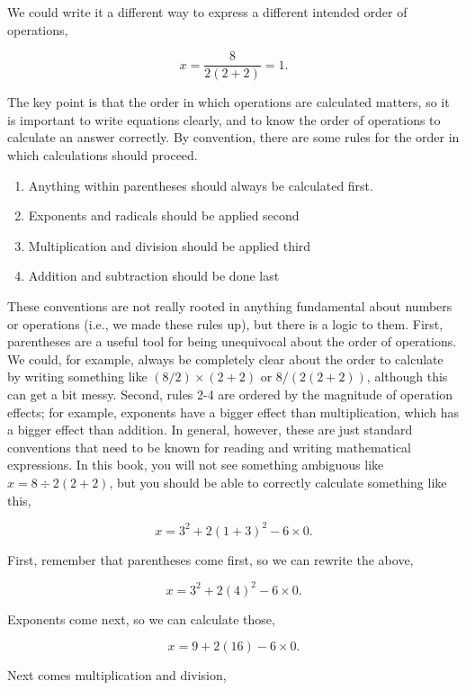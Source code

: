 \documentclass[
]{scrbook}
\providecommand{\tightlist}{%
  \setlength{\itemsep}{0pt}\setlength{\parskip}{0pt}}
\begin{document}
We could write it a different way to express a different intended order of operations,

\[x = \frac{8}{2(2+2)} = 1.\]

The key point is that the order in which operations are calculated matters, so it is important to write equations clearly, and to know the order of operations to calculate an answer correctly.
By convention, there are some rules for the order in which calculations should proceed.

\begin{enumerate}
\def\labelenumi{\arabic{enumi}.}
\tightlist
\item
  Anything within parentheses should always be calculated first.
\item
  Exponents and radicals should be applied second
\item
  Multiplication and division should be applied third
\item
  Addition and subtraction should be done last
\end{enumerate}

These conventions are not really rooted in anything fundamental about numbers or operations (i.e., we made these rules up), but there is a logic to them.
First, parentheses are a useful tool for being unequivocal about the order of operations.
We could, for example, always be completely clear about the order to calculate by writing something like \((8/2) \times (2+2)\) or \(8 / (2(2 + 2))\), although this can get a bit messy.
Second, rules 2-4 are ordered by the magnitude of operation effects; for example, exponents have a bigger effect than multiplication, which has a bigger effect than addition.
In general, however, these are just standard conventions that need to be known for reading and writing mathematical expressions.
In this book, you will not see something ambiguous like \(x = 8 \div 2\left(2+2\right)\), but you should be able to correctly calculate something like this,

\[x = 3^{2} + 2\left(1 + 3\right)^{2} - 6 \times 0.\]

First, remember that parentheses come first, so we can rewrite the above,

\[x = 3^{2} + 2\left(4\right)^{2} - 6 \times 0.\]

Exponents come next, so we can calculate those,

\[x = 9 + 2\left(16\right) - 6 \times 0.\]

Next comes multiplication and division,
\end{document}
